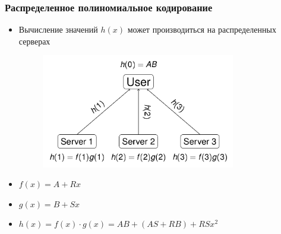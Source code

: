 \documentclass{beamer}
\begin{document}
    \begin{frame}

        \frametitle{Распределенное полиномиальное кодирование}
        \begin{itemize}
            \item Вычисление значений $h(x)$ может производиться на распределенных серверах
            \begin{figure}[t!]
                \includegraphics[width=0.8\textwidth]{poly_code.png}
            \end{figure}
            \item $f(x) = A + Rx$
            \item $g(x) = B + Sx$
            \item $h(x) = f(x) \cdot g(x) = AB + \left(AS + RB\right) + RSx^2$
        \end{itemize}
        
    \end{frame}
\end{document}
